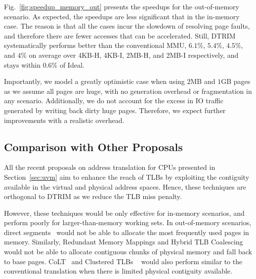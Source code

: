 Fig.~\ref{fig:speedup_memory_out} presents the speedups for the out-of-memory scenario. As expected, the speedups are less significant that in the in-memory case. The reason is that all the cases incur the slowdown of resolving page faults, and therefore there are fewer accesses that can be accelerated. Still, DTRIM systematically performs better than the conventional MMU, $6.1\%$, $5.4\%$, $4.5\%$, and $4\%$ on average over 4KB-H, 4KB-I, 2MB-H, and 2MB-I respectively, and stays within 0.6\% of Ideal. 

Importantly, we model a greatly optimistic case when using $2$MB and $1$GB pages as we assume all pages are huge, with no generation overhead or fragmentation in any scenario. Additionally, we do not account for the excess in IO traffic generated by writing back dirty huge pages. Therefore, we expect further improvements with a realistic overhead. 



\subsection{Comparison with Other Proposals}

All the recent proposals on address translation for CPUs presented in Section~\ref{sec:uvm} aim to enhance the reach of TLBs by exploiting the contiguity available in the virtual and physical address spaces. Hence, these techniques are orthogonal to DTRIM as we reduce the TLB miss penalty. 

However, these techniques would be only effective for in-memory scenarios, and perform poorly for larger-than-memory working sets. In out-of-memory scenarios, direct segments~\cite{basu:efficient} would not be able to allocate the most frequently used pages in memory. Similarly, Redundant Memory Mappings and Hybrid TLB Coalescing~\cite{karakostas:redundant, park:hybrid} would not be able to allocate contiguous chunks of physical memory and fall back to base pages. CoLT~\cite{pham:colt} and Clustered TLBs ~\cite{pham:increasing} would also perform similar to the conventional translation when there is limited physical contiguity available. 

